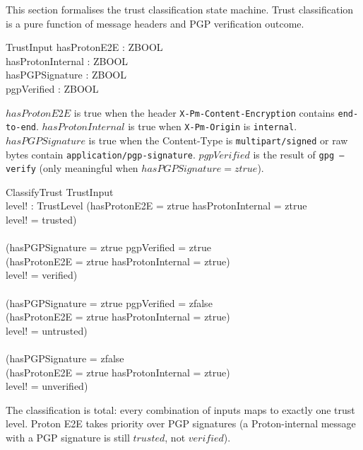 \documentclass[a4paper,10pt,fleqn]{article}
\begin{document}
This section formalises the trust classification state machine.
Trust classification is a pure function of message headers and
PGP verification outcome.

\begin{schema}{TrustInput}
  hasProtonE2E : ZBOOL \\
  hasProtonInternal : ZBOOL \\
  hasPGPSignature : ZBOOL \\
  pgpVerified : ZBOOL
\end{schema}

$hasProtonE2E$ is true when the header
\texttt{X-Pm-Content-Encryption} contains \texttt{end-to-end}.
$hasProtonInternal$ is true when \texttt{X-Pm-Origin} is
\texttt{internal}.  $hasPGPSignature$ is true when the Content-Type
is \texttt{multipart/signed} or raw bytes contain
\texttt{application/pgp-signature}.  $pgpVerified$ is the result of
\texttt{gpg --verify} (only meaningful when $hasPGPSignature = ztrue$).

\begin{schema}{ClassifyTrust}
  TrustInput \\
  level! : TrustLevel
  \where
  (hasProtonE2E = ztrue \land hasProtonInternal = ztrue \\
  \quad \implies level! = trusted) \\
  \land \\
  (hasPGPSignature = ztrue \land pgpVerified = ztrue \\
  \quad \land \lnot (hasProtonE2E = ztrue \land hasProtonInternal = ztrue) \\
  \quad \implies level! = verified) \\
  \land \\
  (hasPGPSignature = ztrue \land pgpVerified = zfalse \\
  \quad \land \lnot (hasProtonE2E = ztrue \land hasProtonInternal = ztrue) \\
  \quad \implies level! = untrusted) \\
  \land \\
  (hasPGPSignature = zfalse \\
  \quad \land \lnot (hasProtonE2E = ztrue \land hasProtonInternal = ztrue) \\
  \quad \implies level! = unverified)
\end{schema}

The classification is total: every combination of inputs maps to
exactly one trust level.  Proton E2E takes priority over PGP
signatures (a Proton-internal message with a PGP signature is
still $trusted$, not $verified$).
\end{document}
